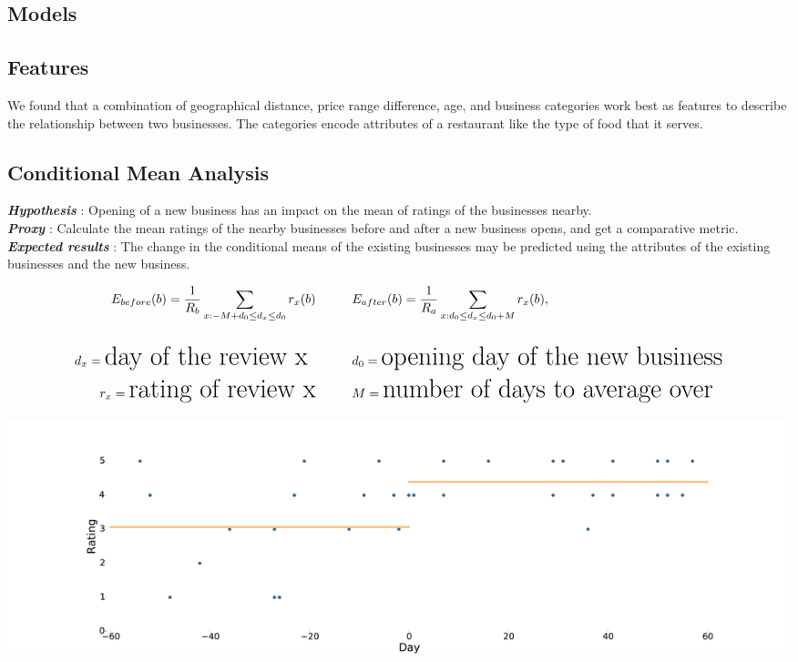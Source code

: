 \documentclass[a0,landscape,beamer]{a0poster}
\begin{document}
\begin{multicols}{4}

\section*{Models}

\subsection*{Features}
We found that a combination of geographical distance, price range difference, age, and business categories work best as features to describe the relationship between two businesses. The categories encode attributes of a restaurant like the type of food that it serves.

\subsection*{Conditional Mean Analysis}
\textbf{\textit{Hypothesis}} : Opening of a new business has an impact on the mean of ratings of the  businesses nearby.\\
\textbf{\textit{Proxy}} : Calculate the mean ratings of the nearby businesses before and after a new business opens, and get a comparative metric.\\
\textbf{\textit{Expected results}} : The change in the conditional means of the existing businesses may be predicted using the attributes of the existing businesses and the new business. 

\begin{small}
\begin{align*}
E_{before}(b)=\frac{1}{R_b} \sum_{x: -M+d_0\le d_x \le d_0} r_x(b)\hspace{10mm} & E_{after}(b)=\frac{1}{R_a} \sum_{x: d_0\le d_x \le d_0+M} r_x(b),\\ \\
d_x = \small\text{day of the review x } \hspace{10mm} &d_0 = \small\text{opening day of the new business} \\
 r_x = \small\text{rating of review x}  \hspace{10mm} &M = \small\text{number of days to average over}
\label{eqn:condMean}
\end{align*}
\end{small}
\begin{center}
\includegraphics[width=\linewidth]{../mean.pdf}
\end{center}


\end{multicols}
\end{document}
